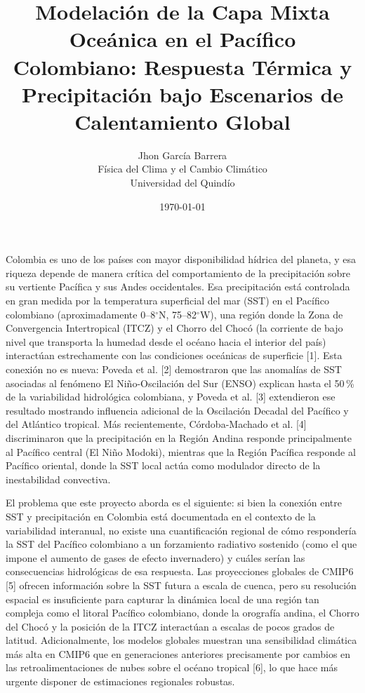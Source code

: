 \documentclass[12pt, letterpaper]{article}
\title{Modelaci\'on de la Capa Mixta Oce\'anica en el Pac\'ifico Colombiano:
	Respuesta T\'ermica y Precipitaci\'on bajo Escenarios de Calentamiento Global}
\author{Jhon Garc\'ia Barrera \\
	F\'isica del Clima y el Cambio Clim\'atico \\
	Universidad del Quind\'io}
\date{\today}
\begin{document}
	
	\maketitle
	
	Colombia es uno de los pa\'ises con mayor disponibilidad h\'idrica del planeta, y esa riqueza
	depende de manera cr\'itica del comportamiento de la precipitaci\'on sobre su vertiente
	Pac\'ifica y sus Andes occidentales. Esa precipitaci\'on est\'a controlada en gran medida
	por la temperatura superficial del mar (SST) en el Pac\'ifico colombiano (aproximadamente
	0--8$^\circ$N, 75--82$^\circ$W), una regi\'on donde la Zona de Convergencia Intertropical
	(ITCZ) y el Chorro del Choc\'o (la corriente de bajo nivel que transporta la humedad desde
	el oc\'eano hacia el interior del pa\'is) interact\'uan estrechamente con las condiciones
	oce\'anicas de superficie [1]. Esta conexi\'on no es nueva: Poveda et al. [2] demostraron
	que las anomal\'ias de SST asociadas al fen\'omeno El Ni\~no-Oscilaci\'on del Sur (ENSO)
	explican hasta el 50\,\% de la variabilidad hidrol\'ogica colombiana, y Poveda et al. [3]
	extendieron ese resultado mostrando influencia adicional de la Oscilaci\'on Decadal del
	Pac\'ifico y del Atl\'antico tropical. M\'as recientemente, C\'ordoba-Machado et al. [4]
	discriminaron que la precipitaci\'on en la Regi\'on Andina responde principalmente al
	Pac\'ifico central (El Ni\~no Modoki), mientras que la Regi\'on Pac\'ifica responde al
	Pac\'ifico oriental, donde la SST local act\'ua como modulador directo de la inestabilidad
	convectiva.
	
	El problema que este proyecto aborda es el siguiente: si bien la conexi\'on entre SST y
	precipitaci\'on en Colombia est\'a documentada en el contexto de la variabilidad interanual,
	no existe una cuantificaci\'on regional de c\'omo responder\'ia la SST del Pac\'ifico
	colombiano a un forzamiento radiativo sostenido (como el que impone el aumento de gases
	de efecto invernadero) y cu\'ales ser\'ian las consecuencias hidrol\'ogicas de esa
	respuesta. Las proyecciones globales de CMIP6 [5] ofrecen informaci\'on sobre la SST futura
	a escala de cuenca, pero su resoluci\'on espacial es insuficiente para capturar la din\'amica
	local de una regi\'on tan compleja como el litoral Pac\'ifico colombiano, donde la
	orograf\'ia andina, el Chorro del Choc\'o y la posici\'on de la ITCZ interact\'uan a escalas
	de pocos grados de latitud. Adicionalmente, los modelos globales muestran una sensibilidad
	clim\'atica m\'as alta en CMIP6 que en generaciones anteriores precisamente por cambios en
	las retroalimentaciones de nubes sobre el oc\'eano tropical [6], lo que hace m\'as urgente
	disponer de estimaciones regionales robustas.
	
\end{document}
